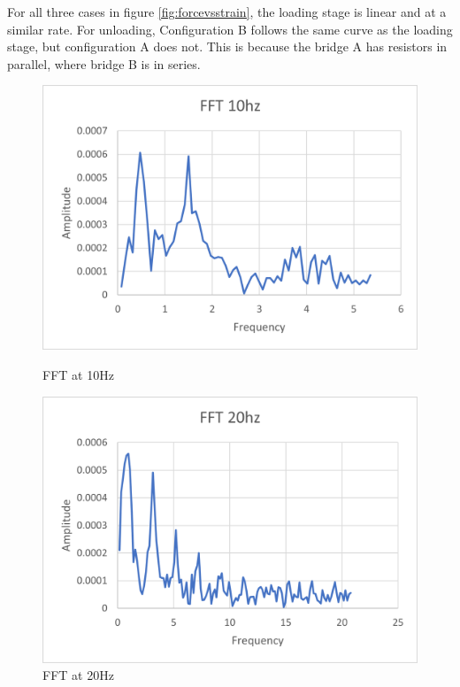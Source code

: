\documentclass{article}
\begin{document}
For all three cases in figure \ref{fig:forcevsstrain}, the loading stage is linear and at a similar rate.  For unloading, Configuration B follows the same curve as the loading stage, but configuration A does not.  This is because the bridge A has resistors in parallel, where bridge B is in series.  


\begin{figure}[H]
    \centering
    \begin{minipage}{.5\textwidth}
      \centering
      \includegraphics[width=.95\linewidth]{lab5images/FFT10hz.png}
      \caption{FFT at 10Hz}
      \label{fig:fft10hz}
    \end{minipage}%
    \begin{minipage}{.5\textwidth}
      \centering
      \includegraphics[width=.95\linewidth]{lab5images/FFT20hz.png}
      \caption{FFT at 20Hz}
      \label{fig:fft20hz}

\end{minipage}
\end{figure}
\end{document}
